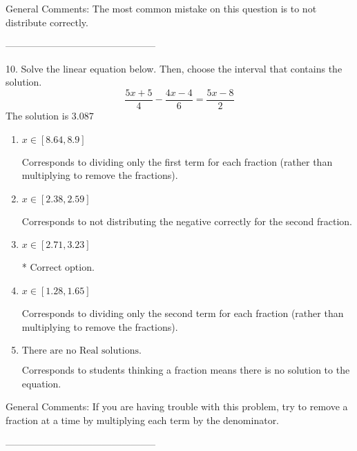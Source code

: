 \documentclass{article}[10pt]
\begin{document}
General Comments: The most common mistake on this question is to not distribute correctly.

-----------------------------------------------

10. Solve the linear equation below. Then, choose the interval that contains the solution.
$$ \frac{5 x + 5}{4} - \frac{4 x - 4}{6} = \frac{5 x - 8}{2} $$ 
The solution is $ 3.087 $ 

\begin{enumerate}[label=\Alph*.] 
\item $ x \in [8.64, 8.9] $ 

  Corresponds to dividing only the first term for each fraction (rather than multiplying to remove the fractions). 
\item $ x \in [2.38, 2.59] $ 

  Corresponds to not distributing the negative correctly for the second fraction. 
\item $ x \in [2.71, 3.23] $ 

 * Correct option. 
\item $ x \in [1.28, 1.65] $ 

  Corresponds to dividing only the second term for each fraction (rather than multiplying to remove the fractions). 
\item $ \text{There are no Real solutions.} $ 

 Corresponds to students thinking a fraction means there is no solution to the equation. 
\end{enumerate} 
 
General Comments: If you are having trouble with this problem, try to remove a fraction at a time by multiplying each term by the denominator.

-----------------------------------------------
\end{document}
